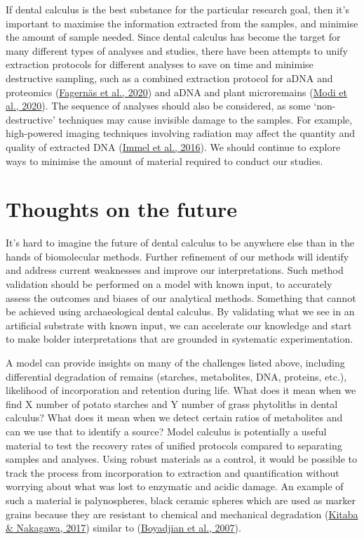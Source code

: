 \documentclass[
  letterpaper,
]{book}
\begin{document}
If dental calculus is the best substance for the particular research
goal, then it's important to maximise the information extracted from the
samples, and minimise the amount of sample needed. Since dental calculus
has become the target for many different types of analyses and studies,
there have been attempts to unify extraction protocols for different
analyses to save on time and minimise destructive sampling, such as a
combined extraction protocol for aDNA and proteomics
(\protect\hyperlink{ref-fagernasUnifiedProtocol2020}{Fagernäs et al.,
2020}) and aDNA and plant microremains
(\protect\hyperlink{ref-modiCalculusMethodologies2020}{Modi et al.,
2020}). The sequence of analyses should also be considered, as some
`non-destructive' techniques may cause invisible damage to the samples.
For example, high-powered imaging techniques involving radiation may
affect the quantity and quality of extracted DNA
(\protect\hyperlink{ref-immelEffectXray2016}{Immel et al., 2016}). We
should continue to explore ways to minimise the amount of material
required to conduct our studies.

\hypertarget{thoughts-on-the-future}{%
\section{Thoughts on the future}\label{thoughts-on-the-future}}

It's hard to imagine the future of dental calculus to be anywhere else
than in the hands of biomolecular methods. Further refinement of our
methods will identify and address current weaknesses and improve our
interpretations. Such method validation should be performed on a model
with known input, to accurately assess the outcomes and biases of our
analytical methods. Something that cannot be achieved using
archaeological dental calculus. By validating what we see in an
artificial substrate with known input, we can accelerate our knowledge
and start to make bolder interpretations that are grounded in systematic
experimentation.

A model can provide insights on many of the challenges listed above,
including differential degradation of remains (starches, metabolites,
DNA, proteins, etc.), likelihood of incorporation and retention during
life. What does it mean when we find X number of potato starches and Y
number of grass phytoliths in dental calculus? What does it mean when we
detect certain ratios of metabolites and can we use that to identify a
source? Model calculus is potentially a useful material to test the
recovery rates of unified protocols compared to separating samples and
analyses. Using robust materials as a control, it would be possible to
track the process from incorporation to extraction and quantification
without worrying about what was lost to enzymatic and acidic damage. An
example of such a material is palynospheres, black ceramic spheres which
are used as marker grains because they are resistant to chemical and
mechanical degradation
(\protect\hyperlink{ref-kitabaBlackCeramic2017}{Kitaba \& Nakagawa,
2017}) similar to
(\protect\hyperlink{ref-boyadjianDentalWash2007}{Boyadjian et al.,
2007}).
\end{document}
